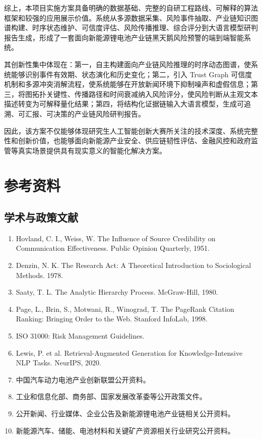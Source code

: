 ﻿\documentclass[12pt,a4paper]{article}
\begin{document}
综上，本项目实施方案具备明确的数据基础、完整的自研工程路线、可解释的算法框架和较强的应用展示价值。系统从多源数据采集、风险事件抽取、产业链知识图谱构建、时序状态维护、可信度评估、风险传播推理、综合评分到大语言模型研判报告生成，形成了一套面向新能源锂电池产业链黑天鹅风险预警的端到端智能系统。

其创新性集中体现在：第一，自主构建面向产业链风险推理的时序动态图谱，使系统能够识别事件有效期、状态演化和历史变化；第二，引入 Trust Graph 可信度机制和多源冲突消解流程，使系统能够在开放新闻环境下抑制噪声和虚假信息；第三，将图拓扑关键性、传播路径和时间衰减纳入风险评分，使风险判断从主观文本描述转变为可解释量化结果；第四，将结构化证据链输入大语言模型，生成可追溯、可汇报、可决策的产业链风险研判报告。

因此，该方案不仅能够体现研究生人工智能创新大赛所关注的技术深度、系统完整性和创新价值，也能够面向新能源产业安全、供应链韧性评估、金融风控和政府监管等真实场景提供具有现实意义的智能化解决方案。



\section{参考资料}
\subsection{学术与政策文献}
\begin{enumerate}
    \item Hovland, C. I., Weiss, W. The Influence of Source Credibility on Communication Effectiveness. Public Opinion Quarterly, 1951.
    \item Denzin, N. K. The Research Act: A Theoretical Introduction to Sociological Methods. 1978.
    \item Saaty, T. L. The Analytic Hierarchy Process. McGraw-Hill, 1980.
    \item Page, L., Brin, S., Motwani, R., Winograd, T. The PageRank Citation Ranking: Bringing Order to the Web. Stanford InfoLab, 1998.
    \item ISO 31000: Risk Management Guidelines.
    \item Lewis, P. et al. Retrieval-Augmented Generation for Knowledge-Intensive NLP Tasks. NeurIPS, 2020.
    \item 中国汽车动力电池产业创新联盟公开资料。
    \item 工业和信息化部、商务部、国家发展改革委等公开政策文件。
    \item 公开新闻、行业媒体、企业公告及新能源锂电池产业链相关公开资料。
    \item 新能源汽车、储能、电池材料和关键矿产资源相关行业研究公开资料。
\end{enumerate}
\end{document}
